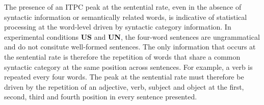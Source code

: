 \documentclass[a4paper,10pt,twoside]{article}
\begin{document}
The presence of an ITPC peak at the sentential rate, even in the
absence of syntactic information or semantically related words, is
indicative of statistical processing at the word-level driven by
syntactic category information. 
%
%
%
%
%
%
%
In experimental conditions \textbf{US} and \textbf{UN}, the four-word sentences are
ungrammatical and do not consitute well-formed sentences. The only
information that occurs at the sentential rate is therefore the
repetition of words that share a common syntactic category at the same
position across sentences. For example, a verb is repeated every four
words. The peak at the sentential rate must therefore be driven by the
repetition of an adjective, verb, subject and object at the first,
second, third and fourth position in every sentence presented.
%
%
%
%
%
%
%
%
\end{document}
